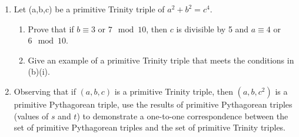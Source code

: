 \documentclass[12pt]{amsart}
\begin{document}
\begin{enumerate}
\begin{enumerate}
\begin{proof}
Additionally, $c\mod 5 = 0, 1, 2, 3, \text{or } 4$. Therefore, $c^4\mod 5 = 0 \text{ or } 1$. 

We now know that $c^4 \not\equiv (1+1) \mod 5$, since $2 \mod 5 \not = 0 \text{ or } 1$. Similarly, $c^4 \not\equiv (4+4) \mod 5$, since $3 \mod 5 \not = 0 \text{ or } 1$.

Therefore, the only solutions to $a^2+b^2=c^4$ have one of $a,\,b$ being equivalent to $1\mod 5$ and the other being equivalent to $4\mod 5$. In this situation, $c^4 \mod 5 \equiv 0$, which means that $c^4$ is divisible by 5.
\end{proof}

\item Let (a,b,c) be a primitive Trinity triple of $a^2+b^2=c^4$.
\begin{enumerate}\setlength{\itemsep}{6pt}
\item Prove that if $b \equiv 3$ or $7\mod 10$, then $c$ is divisible by 5 and $a\equiv 4$ or $6 \mod 10$.
\item Give an example of a primitive Trinity triple that meets the conditions in (b)(i).
\end{enumerate}
\item Observing that if $(a,b,c)$ is a primitive Trinity triple, then $(a,b,c^2)$ is a primitive Pythagorean triple, use the results of primitive Pythagorean triples (values of $s$ and $t$) to demonstrate a one-to-one correspondence between the set of primitive Pythagorean triples and the set of primitive Trinity triples.
\end{enumerate}

\end{enumerate}
\end{document}
